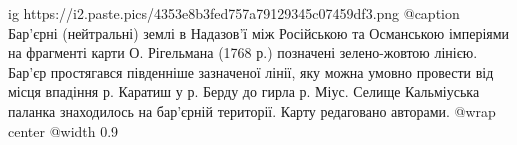 
 
 
 
 

\ifcmt
  ig https://i2.paste.pics/4353e8b3fed757a79129345c07459df3.png
	@caption Бар'єрні (нейтральні) землі в Надазов'ї  між Російською та Османською імперіями на фрагменті карти О. Рігельмана (1768 р.) позначені зелено-жовтою лінією. Бар'єр простягався південніше зазначеної лінії, яку можна умовно провести від місця  впадіння р. Каратиш у р. Берду до гирла р. Міус. Селище Кальміуська паланка знаходилось на бар'єрній території. Карту редаговано авторами.
  @wrap center
  @width 0.9
\fi
